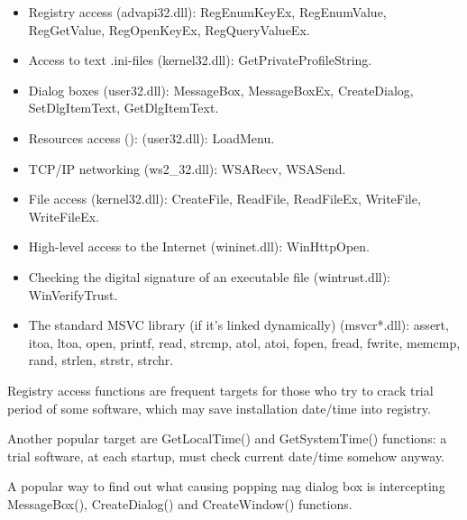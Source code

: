 \begin{itemize}

\item
Registry access (advapi32.dll): 
RegEnumKeyEx, RegEnumValue, RegGetValue, RegOpenKeyEx, RegQueryValueEx.

\item
Access to text .ini-files (kernel32.dll): 
GetPrivateProfileString.

\item
Dialog boxes (user32.dll): 
MessageBox, MessageBoxEx, CreateDialog, SetDlgItemText, GetDlgItemText.

\item
Resources access (): (user32.dll): LoadMenu.

\item
TCP/IP networking (ws2\_32.dll):
WSARecv, WSASend.

\item
File access (kernel32.dll):
CreateFile, ReadFile, ReadFileEx, WriteFile, WriteFileEx.

\item
High-level access to the Internet (wininet.dll): WinHttpOpen.

\item
Checking the digital signature of an executable file (wintrust.dll):
WinVerifyTrust.

\item
The standard MSVC library (if it's linked dynamically) (msvcr*.dll):
assert, itoa, ltoa, open, printf, read, strcmp, atol, atoi, fopen, fread, fwrite, memcmp, rand,
strlen, strstr, strchr.

\end{itemize}


Registry access functions are frequent targets for those who try to crack trial period of some software, which may save
installation date/time into registry.

Another popular target are GetLocalTime() and GetSystemTime() functions:
a trial software, at each startup, must check current date/time somehow anyway.


A popular way to find out what causing popping nag dialog box is intercepting MessageBox(), 
CreateDialog() and CreateWindow() functions.


